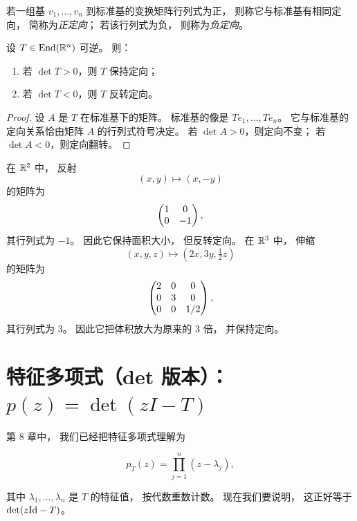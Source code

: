 \begin{definition} 若一组基 \(v_1,\dots,v_n\) 到标准基的变换矩阵行列式为正， 则称它与标准基有相同定向， 简称为\emph{正定向}； 若该行列式为负， 则称为\emph{负定向}。 \end{definition}




\begin{theorem}[定向判别] 设 \(T\in \mathrm{End}(\mathbb{R}^n)\) 可逆。 则：




\begin{enumerate}[label=(\arabic*), leftmargin=2.8em] \item 若 \(\det T>0\)，则 \(T\) 保持定向； \item 若 \(\det T<0\)，则 \(T\) 反转定向。 \end{enumerate} \end{theorem}




\begin{proof} 设 \(A\) 是 \(T\) 在标准基下的矩阵。 标准基的像是 \(Te_1,\dots,Te_n\)。 它与标准基的定向关系恰由矩阵 \(A\) 的行列式符号决定。 若 \(\det A>0\)，则定向不变； 若 \(\det A<0\)，则定向翻转。 \end{proof}




\begin{example} 在 \(\mathbb{R}^2\) 中， 反射 \[ (x,y)\mapsto (x,-y) \] 的矩阵为 \[ \begin{pmatrix} 1&0\\0&-1 \end{pmatrix}, \] 其行列式为 \(-1\)。 因此它保持面积大小， 但反转定向。 在 \(\mathbb{R}^3\) 中， 伸缩 \[ (x,y,z)\mapsto (2x,3y,\tfrac12 z) \] 的矩阵为 \[ \begin{pmatrix} 2&0&0\\0&3&0\\0&0&1/2 \end{pmatrix}, \] 其行列式为 \(3\)。 因此它把体积放大为原来的 \(3\) 倍， 并保持定向。 \end{example}




\section{特征多项式（det 版本）：\(p(z)=\det(zI-T)\)}




第 8 章中， 我们已经把特征多项式理解为




\[ p_T(z)=\prod_{j=1}^n (z-\lambda_j), \]




其中 \(\lambda_1,\dots,\lambda_n\) 是 \(T\) 的特征值， 按代数重数计数。 现在我们要说明， 这正好等于 \(\det(z\mathrm{Id}-T)\)。




